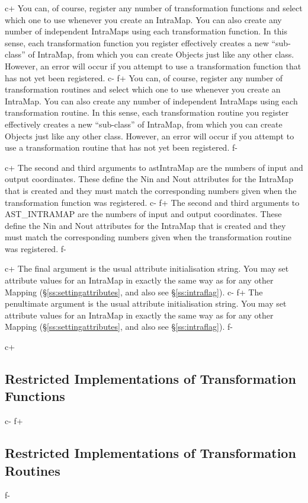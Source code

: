 \documentclass[twoside,11pt]{starlink}
\providecommand{\secref}[1]{\S\ref{#1}}
\begin{document}
c+
You can, of course, register any number of transformation functions
and select which one to use whenever you create an IntraMap. You can
also create any number of independent IntraMaps using each
transformation function. In this sense, each transformation function
you register effectively creates a new ``sub-class'' of IntraMap, from
which you can create Objects just like any other class. However, an
error will occur if you attempt to use a transformation function that
has not yet been registered.
c-
f+
You can, of course, register any number of transformation routines and
select which one to use whenever you create an IntraMap. You can also
create any number of independent IntraMaps using each transformation
routine. In this sense, each transformation routine you register
effectively creates a new ``sub-class'' of IntraMap, from which you
can create Objects just like any other class. However, an error will
occur if you attempt to use a transformation routine that has not yet
been registered.
f-

c+
The second and third arguments to astIntraMap are the numbers of input
and output coordinates. These define the Nin and Nout attributes for
the IntraMap that is created and they must match the corresponding
numbers given when the transformation function was registered.
c-
f+
The second and third arguments to AST\_INTRAMAP are the numbers of
input and output coordinates. These define the Nin and Nout attributes
for the IntraMap that is created and they must match the corresponding
numbers given when the transformation routine was registered.
f-

c+
The final argument is the usual attribute initialisation string. You
may set attribute values for an IntraMap in exactly the same way as
for any other Mapping (\secref{ss:settingattributes}, and also see
\secref{ss:intraflag}).
c-
f+
The penultimate argument is the usual attribute initialisation
string. You may set attribute values for an IntraMap in exactly the
same way as for any other Mapping (\secref{ss:settingattributes}, and
also see \secref{ss:intraflag}).
f-

c+
\subsection{\label{ss:restrictedintramaps}Restricted Implementations of Transformation Functions}
c-
f+
\subsection{\label{ss:restrictedintramaps}Restricted Implementations of Transformation Routines}
f-
\end{document}
